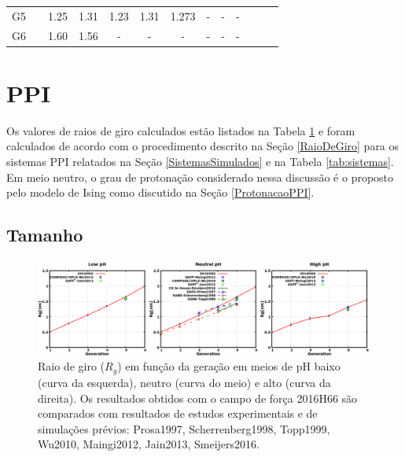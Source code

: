 \begin{landscape}
\begin{table}[t]
{\begin{tabular}{ccccccccccccc}
G5     &                          &   1.25        &   1.31        & 1.23                  &   1.31                &   1.273           &   -               &   -                   &   -   \\
G6    &                          &   1.60        &   1.56        &-                      &-                      &   -               &   -               &   -                   &   -   \\
\hline   \end{tabular}}
\label{tab:PPIRgValidacao}
\end{table}
\end{landscape}

\section{PPI}

Os valores de raios de giro calculados estão listados na Tabela \ref{tab:PPIRgValidacao} e foram calculados de acordo com o procedimento descrito na Seção \ref{RaioDeGiro} para os sistemas PPI relatados na Seção \ref{SistemasSimulados} e na Tabela \ref{tab:sistemas}.
Em meio neutro, o grau de protonação considerado nessa discussão é o proposto pelo modelo de Ising\cite{VanDuijvenbode1998, Koper1997} como discutido na Seção \ref{ProtonacaoPPI}.

\subsection{Tamanho}\label{PPITamanho}

\begin{figure}[ht!]
\centering
\includegraphics[width=\textwidth]{images/PPIRg.png}
\caption{Raio de giro ($R_g$) em função da geração em meios de pH baixo (curva da esquerda), neutro (curva do meio) e alto (curva da direita).
Os resultados obtidos com o campo de força 2016H66\cite{Horta2016} são comparados com resultados de estudos experimentais e de simulações prévios:
Prosa1997\cite{Prosa1997}, %
Scherrenberg1998\cite{Scherrenberg1998}, %
Topp1999\cite{Topp1999}, %
Wu2010\cite{Wu2010}, %
Maingi2012\cite{Maingi2012}, %
Jain2013\cite{Jain2013}, %
Smeijers2016\cite{Smeijers2016}.} %
\label{fig:PPIRg}
\end{figure}

